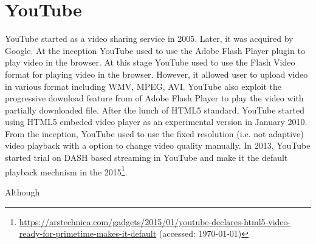 \section{YouTube}
YouTube started as a video sharing service in 2005. Later, it was acquired by Google. At the inception YouTube used to use the Adobe Flash Player plugin to play video in the browser. At this stage YouTube used to use the Flash Video format for playing video in the browser. However, it allowed user to upload video in various format including WMV, MPEG, AVI. YouTube also exploit the progressive download feature from of Adobe Flash Player to play the video with partially downloaded file\cite{10.1145/1298306.1298310}. After the lunch of HTML5 standard, YouTube started using HTML5 embeded video player as an experimental version in January 2010. From the inception, YouTube used to use the fixed resolution (i.e. not adaptive) video playback with a option to change video quality manually.
In 2013, YouTube started trial on DASH based streaming in YouTube and make it the default playback mechnism in the 2015\footnote{\url{https://arstechnica.com/gadgets/2015/01/youtube-declares-html5-video-ready-for-primetime-makes-it-default} (accessed: \today)}.

Although